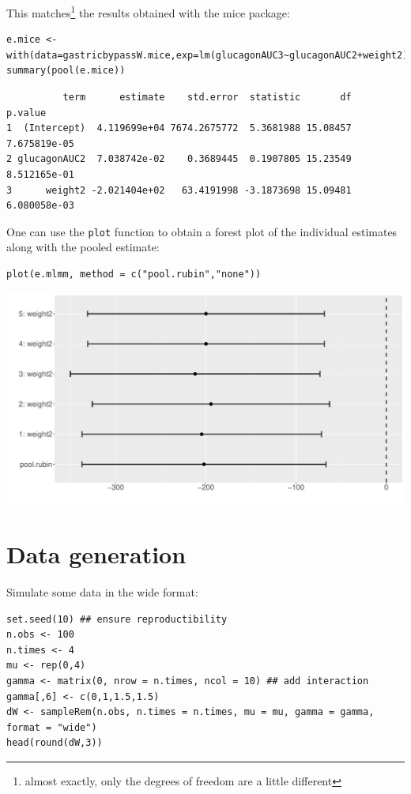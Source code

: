 \documentclass[12pt]{article}
\begin{document}
This matches\footnote{almost exactly, only the degrees of freedom are a
little different} the results obtained with the mice package:
\lstset{language=r,label= ,caption= ,captionpos=b,numbers=none}
\begin{lstlisting}
e.mice <- with(data=gastricbypassW.mice,exp=lm(glucagonAUC3~glucagonAUC2+weight2))
summary(pool(e.mice))
\end{lstlisting}

\begin{verbatim}
          term      estimate    std.error  statistic       df      p.value
1  (Intercept)  4.119699e+04 7674.2675772  5.3681988 15.08457 7.675819e-05
2 glucagonAUC2  7.038742e-02    0.3689445  0.1907805 15.23549 8.512165e-01
3      weight2 -2.021404e+02   63.4191998 -3.1873698 15.09481 6.080058e-03
\end{verbatim}


\clearpage

One can use the \texttt{plot} function to obtain a forest plot of the
individual estimates along with the pooled estimate:
\lstset{language=r,label= ,caption= ,captionpos=b,numbers=none}
\begin{lstlisting}
plot(e.mlmm, method = c("pool.rubin","none"))
\end{lstlisting}

\begin{center}
\includegraphics[trim={0 0 0 0},width=1\textwidth]{./figures/forestplot.pdf}
\end{center}

\clearpage

\section{Data generation}
\label{sec:org72d1274}
Simulate some data in the wide format:
\lstset{language=r,label= ,caption= ,captionpos=b,numbers=none}
\begin{lstlisting}
set.seed(10) ## ensure reproductibility
n.obs <- 100
n.times <- 4
mu <- rep(0,4)
gamma <- matrix(0, nrow = n.times, ncol = 10) ## add interaction
gamma[,6] <- c(0,1,1.5,1.5)
dW <- sampleRem(n.obs, n.times = n.times, mu = mu, gamma = gamma, format = "wide")
head(round(dW,3))
\end{lstlisting}
\end{document}
